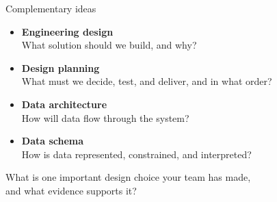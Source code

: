 \documentclass[11pt,aspectratio=43]{beamer}
\begin{document}
\begin{frame}{Complementary ideas}
\begin{itemize}
  \item \textbf{Engineering design}\\What solution should we build, and why?
  \item \textbf{Design planning}\\What must we decide, test, and deliver, and in what order?
  \item \textbf{Data architecture}\\How will data flow through the system?
  \item \textbf{Data schema}\\How is data represented, constrained, and interpreted?
\end{itemize}
\vspace{0.35cm}
\begin{block}{}
What is one important design choice your team has made,\\
and what evidence supports it?
\end{block}
\end{frame}
\end{document}

